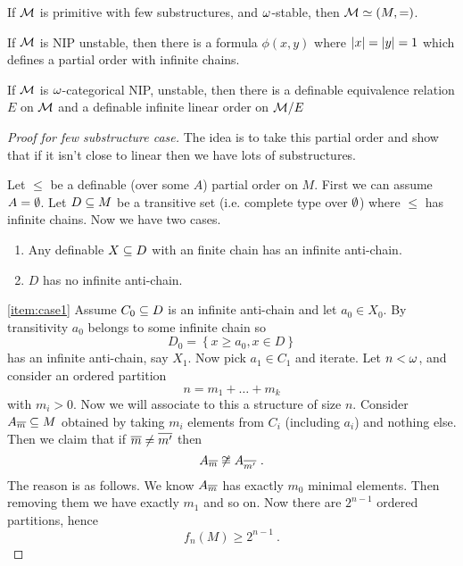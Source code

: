 \documentclass{amsart}
\begin{document}
\begin{fact}
If $\mathcal{M}$ is primitive with few substructures, and $\omega$-stable, then $\mathcal{M}\simeq \left(M ,
=\right)$.
\end{fact}

\begin{fact}[Shelah]
If $\mathcal{M}$ is NIP unstable, then there is a formula
$\phi\left(x,y\right)$ where $\left| x \right| = \left| y \right| = 1$ which defines a partial order
with infinite chains.
\end{fact}

\begin{fact}
If $\mathcal{M}$ is $\omega$-categorical NIP, unstable, then there is a definable equivalence
relation $E$ on $\mathcal{M}$ and a definable infinite linear order on $\mathcal{M} / E$
\end{fact}

\begin{proof}[Proof for few substructure case]
The idea is to take this partial order and show that if it isn't close to linear then we
have lots of substructures.

Let $\leq$ be a definable (over some $A$) partial order on $M$. 
First we can assume $A= \emptyset$. Let $D\subseteq M$ be a transitive set
(i.e. complete type over $\emptyset$) where $\leq$ has infinite chains.
Now we have two cases. 
\begin{enumerate}[label = \textit{Case \numbers:}]
\item Any definable $X\subseteq D$ with an finite chain has an infinite anti-chain.
\label{item:case1}
\item $D$ has no infinite anti-chain.
\label{item:case2}
\end{enumerate}

\ref{item:case1}
Assume $C_0\subseteq D$ is an infinite anti-chain and let $a_0\in X_0$. 
By transitivity $a_0$ belongs to some infinite chain so 
\begin{equation}
D_0 = \left\{x\geq a_0, x\in D\right\}
\end{equation}
has an infinite anti-chain, say $X_1$. Now pick $a_1\in C_1$ and iterate. 
Let $n < \omega$, and consider an ordered partition
\begin{equation}
n = m_1 + \ldots + m_k 
\end{equation}
with $m_i > 0$.
Now we will associate to this a structure of size $n$. 
Consider $A_{\overline{m}}\subseteq M$ obtained by taking $m_i$ elements from $C_i$ (including
$a_i$) and nothing else. 
Then we claim that if $\overline{m}\neq \overline{m'}$ then 
\begin{equation}
A_{\oline{m}}\not\simeqq A_{\oline{m'}} \ .
\end{equation}
The reason is as follows. We know $A_{\overline{m}}$ has exactly $m_0$ minimal elements. Then
removing them we have exactly $m_1$ and so on.
Now there are $2^{n-1}$ ordered partitions, hence 
\begin{equation}
f_n\left(M\right) \geq 2^{n-1} \ .
\end{equation}


\end{proof}
\end{document}
